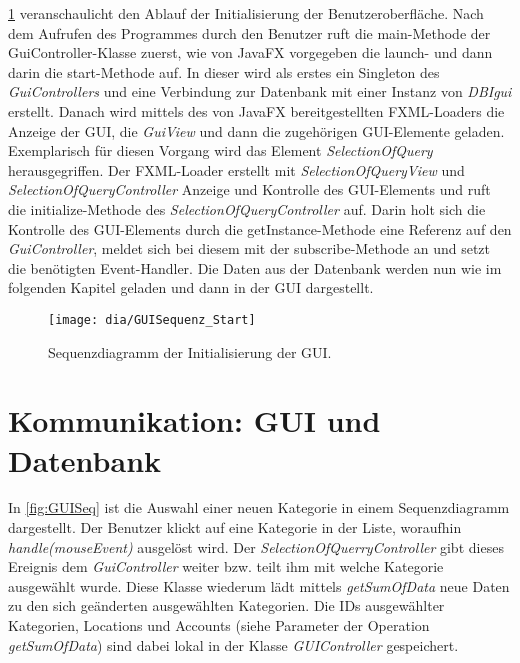 \cref{fig:GUIStartSeq} veranschaulicht den Ablauf der Initialisierung der Benutzeroberfläche. Nach dem Aufrufen des Programmes durch den Benutzer ruft die main-Methode der GuiController-Klasse zuerst, wie von JavaFX vorgegeben die launch- und dann darin die start-Methode auf.
In dieser wird als erstes ein Singleton des \emph{GuiControllers} und eine Verbindung zur Datenbank mit einer Instanz von \emph{DBIgui} erstellt. Danach wird mittels des von JavaFX bereitgestellten FXML-Loaders die Anzeige der GUI, die \emph{GuiView} und dann die zugehörigen GUI-Elemente geladen.
Exemplarisch für diesen Vorgang wird das Element \emph{SelectionOfQuery} herausgegriffen.
Der FXML-Loader erstellt mit \emph{SelectionOfQueryView} und \emph{SelectionOfQueryController} Anzeige und Kontrolle des GUI-Elements und ruft die initialize-Methode des \emph{SelectionOfQueryController} auf.
Darin holt sich die Kontrolle des GUI-Elements durch die getInstance-Methode eine Referenz auf den \emph{GuiController}, meldet sich bei diesem mit der subscribe-Methode an und setzt die benötigten Event-Handler.
Die Daten aus der Datenbank werden nun wie im folgenden Kapitel geladen und dann in der GUI dargestellt.
\begin{figure}[h!]
	\centering
	\texttt{[image: dia/GUISequenz\_Start]}
	\caption{Sequenzdiagramm der Initialisierung der GUI.}
	\label{fig:GUIStartSeq}
\end{figure}
\section{Kommunikation: GUI und Datenbank}
In \cref{fig:GUISeq} ist die Auswahl einer neuen Kategorie in einem Sequenzdiagramm dargestellt. Der Benutzer klickt auf eine Kategorie in der Liste, woraufhin \emph{handle(mouseEvent)} ausgelöst wird. Der \emph{SelectionOfQuerryController} gibt dieses Ereignis dem \emph{GuiController} weiter bzw.  teilt ihm mit welche Kategorie ausgewählt wurde. Diese Klasse wiederum lädt mittels \emph{getSumOfData} neue Daten zu den sich geänderten ausgewählten Kategorien. Die IDs ausgewählter Kategorien, Locations und Accounts (siehe Parameter der Operation \emph{getSumOfData}) sind dabei lokal in der Klasse \emph{GUIController} gespeichert.


